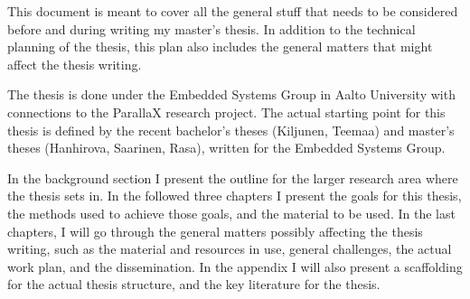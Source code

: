 This document is meant to cover all the general stuff that needs to be considered before and during writing my master's thesis. In addition to the technical planning of the thesis, this plan also includes the general matters that might affect the thesis writing.

The thesis is done under the Embedded Systems Group in Aalto University with connections to the ParallaX research project. The actual starting point for this thesis is defined by the recent bachelor's theses (Kiljunen, Teemaa) and master's theses (Hanhirova, Saarinen, Rasa), written for the Embedded Systems Group.

In the background section I present the outline for the larger research area where the thesis sets in. In the followed three chapters I present the goals for this thesis, the methods used to achieve those goals, and the material to be used. In the last chapters, I will go through the general matters possibly affecting the thesis writing, such as the material and resources in use, general challenges, the actual work plan, and the dissemination. In the appendix I will also present a scaffolding for the actual thesis structure, and the key literature for the thesis.

